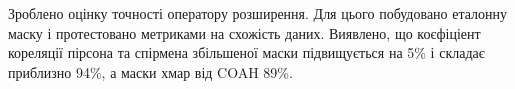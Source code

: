 \clearpage
\chapterConclusion
Зроблено оцінку точності оператору розширення. Для цього побудовано
еталонну маску і протестовано метриками на схожість даних. Виявлено, що
коєфіціент кореляції пірсона та спірмена збільшеної маски підвищується
на 5\% і складає приблизно 94\%, а маски хмар від COAH 89\%.